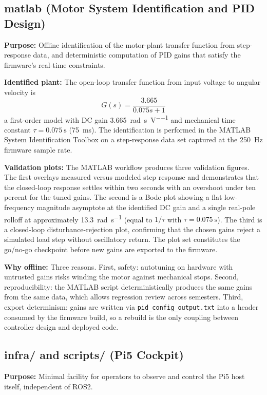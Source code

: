 \documentclass[11pt,letterpaper]{article}
\begin{document}
\subsection{matlab (Motor System Identification and PID Design)}
\textbf{Purpose:} Offline identification of the motor-plant transfer
function from step-response data, and deterministic computation of PID
gains that satisfy the firmware's real-time constraints.

\textbf{Identified plant:} The open-loop transfer function from input
voltage to angular velocity is
\[
  G(s) = \frac{3.665}{0.075 s + 1}
\]
a first-order model with DC gain \qty{3.665}{\radian\per\second\per\volt}
and mechanical time constant $\tau = \qty{0.075}{\second}$
(\qty{75}{\milli\second}). The identification is performed in the
MATLAB System Identification Toolbox on a step-response data set
captured at the \qty{250}{\hertz} firmware sample rate.

\textbf{Validation plots:} The MATLAB workflow produces three
validation figures. The first overlays measured versus modeled
step response and demonstrates that the closed-loop response settles
within two seconds with an overshoot under ten percent for the tuned
gains. The second is a Bode plot showing a flat low-frequency
magnitude asymptote at the identified DC gain and a single real-pole
rolloff at approximately \qty{13.3}{\radian\per\second}
(equal to $1/\tau$ with $\tau = \qty{0.075}{\second}$). The third is a
closed-loop disturbance-rejection plot, confirming that the chosen
gains reject a simulated load step without oscillatory return. The
plot set constitutes the go/no-go checkpoint before new gains are
exported to the firmware.

\textbf{Why offline:} Three reasons. First, safety: autotuning on
hardware with untrusted gains risks winding the motor against
mechanical stops. Second, reproducibility: the MATLAB script
deterministically produces the same gains from the same data, which
allows regression review across semesters. Third, export determinism:
gains are written via \texttt{pid\_config\_output.txt} into a header
consumed by the firmware build, so a rebuild is the only coupling
between controller design and deployed code.

\subsection{infra/ and scripts/ (Pi5 Cockpit)}
\textbf{Purpose:} Minimal facility for operators to observe and
control the Pi5 host itself, independent of ROS2.
\end{document}
